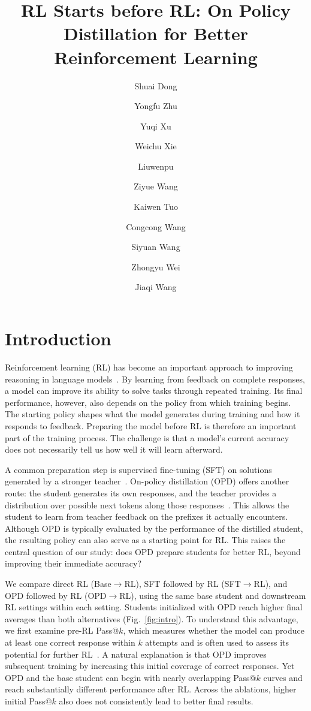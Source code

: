 \documentclass[]{jingdong}
\title{RL Starts before RL: On Policy Distillation for Better Reinforcement Learning}
\author[1,2,3,\ddagger]{Shuai Dong}
\author[3,\ddagger]{Yongfu Zhu}
\author[3,\ddagger]{Yuqi Xu}
\author[3,4,\ddagger]{Weichu Xie}
\author[3,4,\ddagger]{Liuwenpu}
\author[3,4,\ddagger]{Ziyue Wang}
\author[3,5,\ddagger]{Kaiwen Tuo}
\author[3,\ddagger]{Congcong Wang}
\author[6,*]{Siyuan Wang}
\author[1,2,*]{Zhongyu Wei}
\author[3,\dagger]{Jiaqi Wang}
\affiliation[1]{Fudan University}
\affiliation[2]{SII}
\affiliation[3]{JD.COM}
\affiliation[4]{Peking University}
\affiliation[5]{The Hong Kong University of Science and Technology}
\affiliation[6]{The Chinese University of Hong Kong}
\theoremstyle{plain}
\theoremstyle{definition}
\theoremstyle{remark}
\newcommand{\opdrl}{OPD$\rightarrow$RL}
\newcommand{\baserl}{Base$\rightarrow$RL}
\newcommand{\sftrl}{SFT$\rightarrow$RL}
\begin{document}
\maketitle

\section{Introduction}
\label{sec:intro}
Reinforcement learning (RL) has become an important approach to improving reasoning in language models~\citep{grpo,deepseekr1,dapo}. By learning from feedback on complete responses, a model can improve its ability to solve tasks through repeated training. Its final performance, however, also depends on the policy from which training begins. The starting policy shapes what the model generates during training and how it responds to feedback. Preparing the model before RL is therefore an important part of the training process. The challenge is that a model's current accuracy does not necessarily tell us how well it will learn afterward.

A common preparation step is supervised fine-tuning (SFT) on solutions generated by a stronger teacher~\citep{kim2016sequence,hsieh2023distilling}. On-policy distillation (OPD) offers another route: the student generates its own responses, and the teacher provides a distribution over possible next tokens along those responses~\citep{agarwal2024gkd,li2026rethinkingopd}. This allows the student to learn from teacher feedback on the prefixes it actually encounters. Although OPD is typically evaluated by the performance of the distilled student, the resulting policy can also serve as a starting point for RL. This raises the central question of our study: does OPD prepare students for better RL, beyond improving their immediate accuracy?

We compare direct RL (\baserl{}), SFT followed by RL (\sftrl{}), and OPD followed by RL (\opdrl{}), using the same base student and downstream RL settings within each setting. Students initialized with OPD reach higher final averages than both alternatives (Fig.~\ref{fig:intro}). To understand this advantage, we first examine pre-RL Pass@$k$, which measures whether the model can produce at least one correct response within $k$ attempts and is often used to assess its potential for further RL~\citep{yue2025rlcapacity,wu2025invisible}. A natural explanation is that OPD improves subsequent training by increasing this initial coverage of correct responses. Yet OPD and the base student can begin with nearly overlapping Pass@$k$ curves and reach substantially different performance after RL. Across the ablations, higher initial Pass@$k$ also does not consistently lead to better final results.
\end{document}
